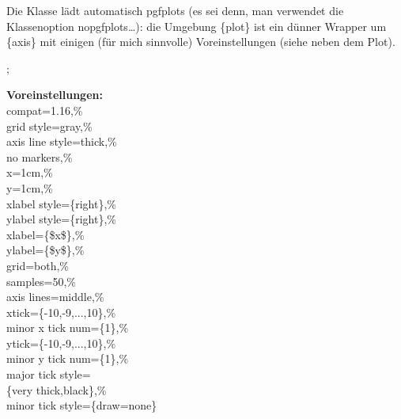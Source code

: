 \documentclass[hyperworksheet]{drcschool}
\newcommand*{\pkg}[1]{\textup{\ttfamily#1}}                                %
\newcommand*{\opt}[1]{\textup{\ttfamily#1}}                                %
\newcommand*{\env}[1]{\textup{\ttfamily\{#1\}}}                            %
\newcommand*{\param}[1]{\mbox{\normalfont$\langle$\textit{#1}$\rangle$}}   %
\begin{document}
\begin{worksheet*}[title={Verschiedenes},solution=true]

\exercise[Plots]
Die Klasse lädt automatisch \pkg{pgfplots} (es sei denn, man verwendet die
Klassenoption \opt{nopgfplots}\ldots): die Umgebung \env{plot} ist
ein dünner Wrapper um \env{axis} mit einigen (für mich sinnvolle) Voreinstellungen
(siehe neben dem Plot).

\noindent
\begin{plot}[xmin=-5,xmax=5,ymin=-3.7,ymax=4.5]
 ;
\end{plot}\hfill
\parbox[b]{.3\linewidth}{%
   \footnotesize
   \textbf{Voreinstellungen:}\\
   \ttfamily
   compat=1.16,\%\\
   grid style=gray,\%\\
   axis line style=thick,\%\\
   no markers,\%\\
   x=1cm,\%\\
   y=1cm,\%\\
   xlabel style=\{right\},\%\\
   ylabel style=\{right\},\%\\
   xlabel=\{\$x\$\},\%\\
   ylabel=\{\$y\$\},\%\\
   grid=both,\%\\
   samples=50,\%\\
   axis lines=middle,\%\\
   xtick=\{-10,-9,...,10\},\%\\
   minor x tick num=\{1\},\%\\
   ytick=\{-10,-9,...,10\},\%\\
   minor y tick num=\{1\},\%\\
   major tick style=\\\null\qquad\{very thick,black\},\%\\
   minor tick style=\{draw=none\}
}


\end{worksheet*}
\end{document}
